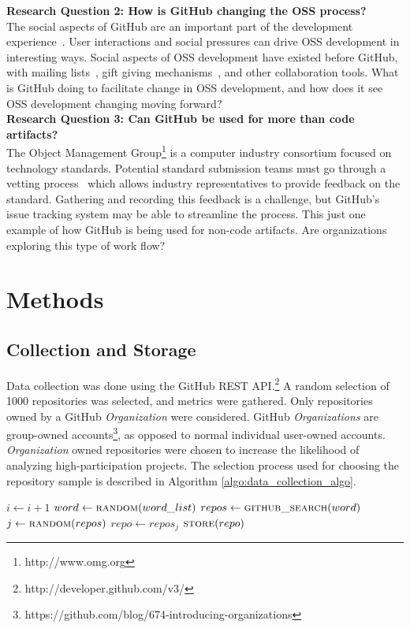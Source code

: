 \documentclass{proc}
\begin{document}
\noindent \textbf{Research Question 2: How is GitHub changing the OSS process?}\\
The social aspects of GitHub are an important part of the development experience~\cite{dabbish2012social}. User interactions and social pressures can drive OSS development in interesting ways. Social aspects of OSS development have existed before GitHub, with mailing lists~\cite{mockus2000case}, gift giving mechanisms~\cite{bergquist2008power}, and other collaboration tools. What is GitHub doing to facilitate change in OSS development, and how does it see OSS development changing moving forward?\\

\noindent \textbf{Research Question 3: Can GitHub be used for more than code artifacts?}\\
The Object Management Group\textsuperscript{\textregistered}\footnote{http://www.omg.org} is a computer industry consortium focused on technology standards. Potential standard submission teams must go through a vetting process~\cite{kobryn1999uml} which allows industry representatives to provide feedback on the standard. Gathering and recording this feedback is a challenge, but GitHub's issue tracking system may be able to streamline the process. This just one example of how GitHub is being used for non-code artifacts. Are organizations exploring this type of work flow?

\section{Methods}
\subsection{Collection and Storage}
Data collection was done using the GitHub REST API.\footnote{http://developer.github.com/v3/} A random selection of 1000 repositories was selected, and metrics were gathered. Only repositories owned by a GitHub \textit{Organization} were considered. GitHub \textit{Organizations} are group-owned accounts\footnote{https://github.com/blog/674-introducing-organizations}, as opposed to normal individual user-owned accounts. \textit{Organization} owned repositories were chosen to increase the likelihood of analyzing high-participation projects. The selection process used for choosing the repository sample is described in Algorithm \ref{algo:data_collection_algo}.

\begin{algorithm}[H]
\label{algo:data_collection_algo}
\begin{algorithmic}[1]
\State $i \gets i + 1$
\State $word \gets \textsc{random}(word\_list)$
\State $repos \gets \textsc{github\_search}(word)$
\State $j \gets \textsc{random}(repos)$
\State $repo \gets repos_j$
\State $\textsc{store}(repo)$
\EndIf 
\EndWhile
\end{algorithmic}
\end{algorithm}
\end{document}
